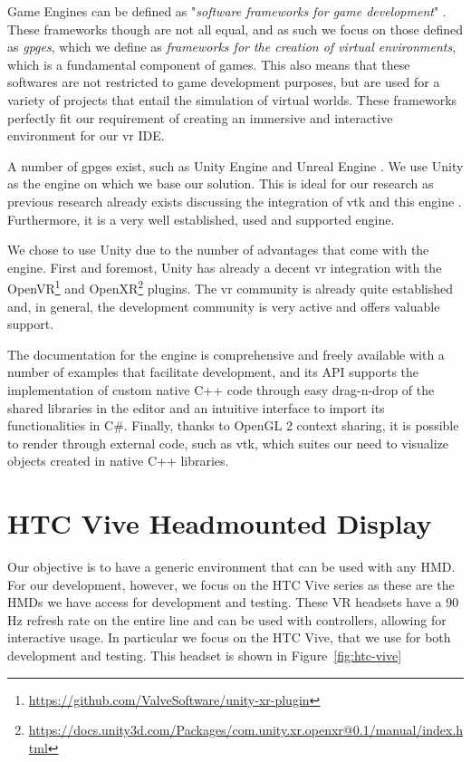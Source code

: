 Game Engines can be defined as "\textit{software frameworks for game development}" \cite{politowski2021game}. These frameworks though are not all equal, and as such we focus on those defined as \textit{\acrfull{gpge}s}, which we define as \textit{frameworks for the creation of virtual environments}, which is a fundamental component of games. This also means that these softwares are not restricted to game development purposes, but are used for a variety of projects that entail the simulation of virtual worlds. These frameworks perfectly fit our requirement of creating an immersive and interactive environment for our \acrshort{vr} IDE.

A number of \acrshort{gpge}s exist, such as Unity Engine \cite{haas2014history} and Unreal Engine \cite{unrealengine}. We use Unity as the engine on which we base our solution. This is ideal for our research as previous research already exists discussing the integration of \acrshort{vtk} and this engine \cite{wheeler_virtual_2018}. Furthermore, it is a very well established, used and supported engine.

We chose to use Unity due to the number of advantages that come with the engine. First and foremost, Unity has already a decent \acrshort{vr} integration with the OpenVR\footnote{\url{https://github.com/ValveSoftware/unity-xr-plugin}} and OpenXR\footnote{\url{https://docs.unity3d.com/Packages/com.unity.xr.openxr@0.1/manual/index.html}} plugins. The \acrshort{vr} community is already quite established and, in general, the development community is very active and offers valuable support. 

The documentation for the engine is comprehensive and freely available with a number of examples that facilitate development, and its API supports the implementation of custom native C++ code through easy drag-n-drop of the shared libraries in the editor and an intuitive interface to import its functionalities in C\#. Finally, thanks to OpenGL 2 context sharing, it is possible to render through external code, such as \acrshort{vtk}, which suites our need to visualize objects created in native C++ libraries.

\section{HTC Vive Headmounted Display}

Our objective is to have a generic environment that can be used with any HMD. For our development, however, we focus on the HTC Vive series as these are the HMDs we have access for development and testing. These VR headsets have a 90 Hz refresh rate on the entire line and can be used with controllers, allowing for interactive usage. In particular we focus on the HTC Vive, that we use for both development and testing. This headset is shown in Figure~\ref{fig:htc-vive}

